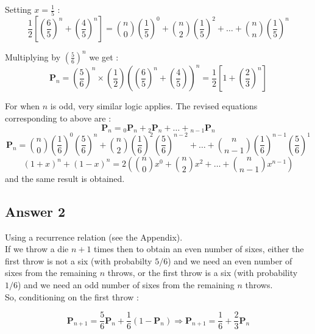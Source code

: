 \documentclass[a4paper,10pt]{article}
\begin{document}
\begin{flushleft}
Setting $x = \frac{1}{5}$ :
\begin{equation*} 
\frac{1}{2}\left[\left(\frac{6}{5}\right)^n + \left(\frac{4}{5}\right)^n \right] = 
\binom{n}{0}\left(\frac{1}{5}\right)^0 + \binom{n}{2}\left(\frac{1}{5}\right)^2 + \ldots + \binom{n}{n}\left(\frac{1}{5}\right)^n 
\end{equation*} 

Multiplying by $\left(\frac{5}{6}\right)^n$ we get :
\begin{equation*} 
\mathbf{P}_n = \left(\frac{5}{6} \right)^n \times \left(\frac{1}{2} \right) 
\left(\left(\frac{6}{5} \right)^n + \left(\frac{4}{5} \right)\right)^n  
= \frac{1}{2} \left[1 + \left({\frac{2}{3}}\right)^n\right] 
\end{equation*}
 
For when $n$ is odd, very similar logic applies. The revised equations corresponding to above are : 
\begin{equation*} 
\mathbf{P}_n = {}_0\mathbf{P}_n + {}_2\mathbf{P}_n + \ldots + {}_{n-1}\mathbf{P}_n  
\end{equation*}
\begin{equation*} 
\mathbf{P}_n = \binom{n}{0} \left(\frac{1}{6}\right)^0 \left(\frac{5}{6}\right)^{n} + 
\binom{n}{2} \left(\frac{1}{6}\right)^2 \left(\frac{5}{6}\right)^{n-2} + \ldots + \binom{n}{n-1} \left(\frac{1}{6}\right)^{n-1} \left(\frac{5}{6}\right)^{1}
\end{equation*}
\begin{equation*} 
\left(1+x\right)^n + \left(1-x\right)^n = 2\left(\binom{n}{0}x^0 + \binom{n}{2}x^2 + \ldots + \binom{n}{n-1}x^{n-1}\right) 
\end{equation*} 
and the same result is obtained.

\subsection{Answer 2}
Using a recurrence relation (see the Appendix). \\
If we throw a die $n+1$ times then to obtain an even number of sixes, either the first throw is not a six (with probabilty $5/6$) and we need an 
even number of sixes from the remaining $n$ throws, or the first throw is a six (with probability $1/6$) 
and we need an odd number of sixes from the remaining $n$ throws.
\\
So, conditioning on the first throw :

\begin{equation*} 
\mathbf{P}_{n+1} = \frac{5}{6}\mathbf{P}_{n} + \frac{1}{6}(1-\mathbf{P}_{n})
\Rightarrow \mathbf{P}_{n+1} = \frac{1}{6} + \frac{2}{3}\mathbf{P}_{n}
\end{equation*} 


\end{flushleft}
\end{document}
